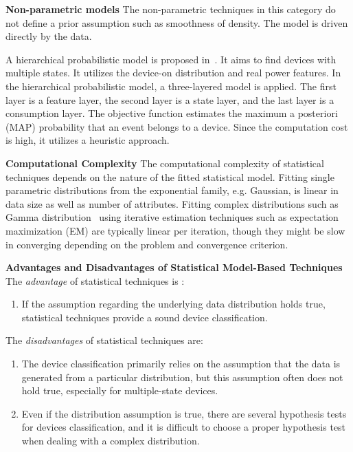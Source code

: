 \textbf{Non-parametric models}
The non-parametric techniques in this category do not 
define a  prior assumption such as smoothness of density.
The model is driven directly by the data.

A hierarchical probabilistic model is proposed in~\cite{wang2013heirarchical}.
It aims to find devices with multiple states. 
It utilizes the device-on distribution and real power features. 
In the hierarchical probabilistic model, a three-layered model is applied. 
The first layer is a feature layer, the second layer is a state layer, 
and the last layer is a consumption layer. 
The objective function estimates the maximum a posteriori (MAP) 
probability that an event belongs to a device. 
Since the computation cost is high, it 
utilizes a heuristic approach. 


\textbf{Computational Complexity}
The computational complexity of statistical techniques 
depends on the nature of the fitted statistical model.
Fitting single parametric distributions from the exponential family, 
e.g. Gaussian, is linear in data size as well as number of attributes. 
Fitting complex distributions such as Gamma distribution~\cite{kim2011unsupervised} 
using iterative 
estimation techniques such as expectation maximization (EM) are 
typically linear per iteration, though they might be slow 
in converging depending on the problem and convergence criterion. 

\textbf{Advantages and Disadvantages of Statistical Model-Based Techniques}
The \textit{advantage} of statistical techniques is :
\begin{enumerate}
\item If the assumption regarding the underlying data distribution 
holds true, statistical techniques provide a sound device classification. 
\end{enumerate}
The \textit{disadvantages} of statistical techniques are:
\begin{enumerate}
\item The device classification primarily relies on the assumption 
that the data is generated from a particular distribution, but this assumption often does not hold true, especially for multiple-state 
devices. 
\item Even if the distribution assumption is true, 
there are several hypothesis tests for devices classification,  
and it is difficult to choose a proper hypothesis test when dealing with a complex distribution. 
\end{enumerate}

